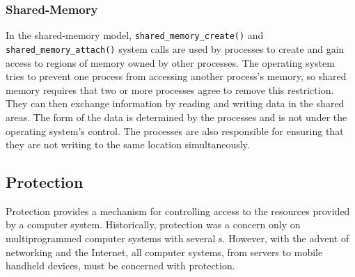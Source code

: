 \subsubsection{Shared-Memory}\label{subsubsec:Shared_Memory}
In the shared-memory model, \texttt{shared_memory_create()} and \texttt{shared_memory_attach()} system calls are used by processes to create and gain access to regions of memory owned by other processes.
The operating system tries to prevent one process from accessing another process’s memory, so shared memory requires that two or more processes agree to remove this restriction.
They can then exchange information by reading and writing data in the shared areas.
The form of the data is determined by the processes and is not under the operating system’s control.
The processes are also responsible for ensuring that they are not writing to the same location simultaneously.

\subsection{Protection}\label{subsec:Protection}
Protection provides a mechanism for controlling access to the resources provided by a computer system.
Historically, protection was a concern only on multiprogrammed computer systems with several s.
However, with the advent of networking and the Internet, all computer systems, from servers to mobile handheld devices, must be concerned with protection.

